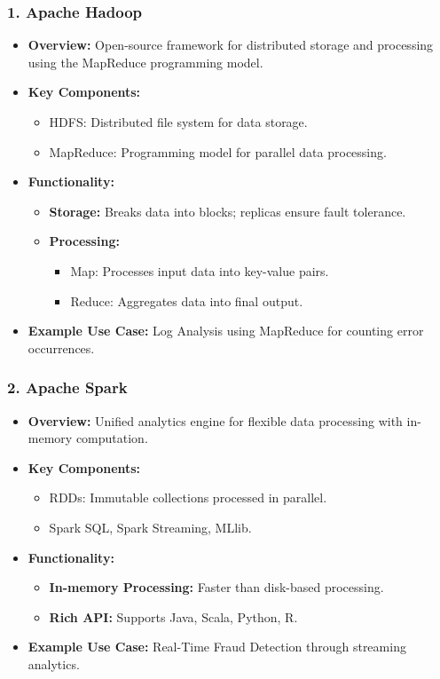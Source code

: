 \documentclass[aspectratio=169]{beamer}
\begin{document}
\begin{frame}
    \frametitle{1. Apache Hadoop}
    \begin{itemize}
        \item \textbf{Overview:} Open-source framework for distributed storage and processing using the MapReduce programming model.
        \item \textbf{Key Components:}
        \begin{itemize}
            \item HDFS: Distributed file system for data storage.
            \item MapReduce: Programming model for parallel data processing.
        \end{itemize}
        \item \textbf{Functionality:}
        \begin{itemize}
            \item \textbf{Storage:} Breaks data into blocks; replicas ensure fault tolerance.
            \item \textbf{Processing:}
            \begin{itemize}
                \item Map: Processes input data into key-value pairs.
                \item Reduce: Aggregates data into final output.
            \end{itemize}
        \end{itemize}
        \item \textbf{Example Use Case:} Log Analysis using MapReduce for counting error occurrences.
    \end{itemize}
\end{frame}

\begin{frame}[fragile]
    \frametitle{2. Apache Spark}
    \begin{itemize}
        \item \textbf{Overview:} Unified analytics engine for flexible data processing with in-memory computation.
        \item \textbf{Key Components:}
        \begin{itemize}
            \item RDDs: Immutable collections processed in parallel.
            \item Spark SQL, Spark Streaming, MLlib.
        \end{itemize}
        \item \textbf{Functionality:}
        \begin{itemize}
            \item \textbf{In-memory Processing:} Faster than disk-based processing.
            \item \textbf{Rich API:} Supports Java, Scala, Python, R.
        \end{itemize}
        \item \textbf{Example Use Case:} Real-Time Fraud Detection through streaming analytics.
    \end{itemize}
\end{frame}
\end{document}

